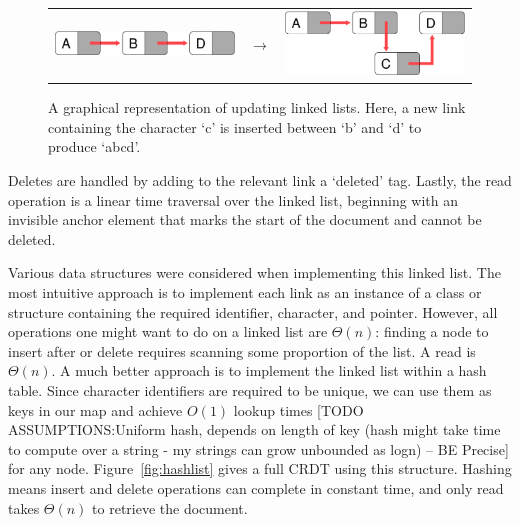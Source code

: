 \documentclass[12pt,a4paper,twoside,openright]{report}
\begin{document}
		\begin{figure}[htb]
		\centering
		  \begin{tabular}{ >{\centering}m{6cm} >{\centering}m{15mm} >{\centering\arraybackslash}m{6cm} }
		    \includegraphics[width=1\linewidth]{figs/linkedlist_0.eps}  &
		    $\longrightarrow$  &
		    \includegraphics[width=1\linewidth]{figs/linkedlist.eps}
		  \end{tabular}
		\caption[Updating linked lists]{A graphical representation of updating linked lists. Here, a new link containing the character `c' is inserted between `b' and `d' to produce `abcd'.}
		\label{fig:linkedlist}
		\end{figure}
		
		Deletes are handled by adding to the relevant link a `deleted' tag. Lastly, the read operation is a linear time traversal over the linked list, beginning with an invisible anchor element that marks the start of the document and cannot be deleted.
		
		Various data structures were considered when implementing this linked list. The most intuitive approach is to implement each link as an instance of a class or structure containing the required identifier, character, and pointer. However, all operations one might want to do on a linked list are $\Theta (n)$: finding a node to insert after or delete requires scanning some proportion of the list. A read is $\Theta (n)$. A much better approach is to implement the linked list within a hash table. Since character identifiers are required to be unique, we can use them as keys in our map and achieve $O(1)$ lookup times [TODO ASSUMPTIONS:Uniform hash, depends on length of key (hash might take time to compute over a string - my strings can grow unbounded as logn) -- BE Precise] for any node. Figure~\ref{fig:hashlist} gives a full CRDT using this structure. Hashing means insert and delete operations can complete in constant time, and only read takes $\Theta (n)$ to retrieve the document.
		
\end{document}
